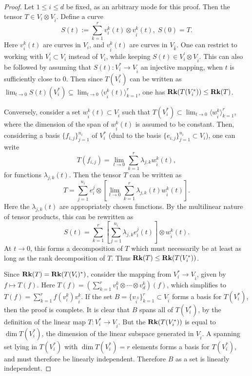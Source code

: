 \documentclass[../Lael_John_MasterThesis_Draft.tex]{subfiles}
\begin{document}
\begin{proof}
    Let $1 \leq i \leq d$ be fixed, as an arbitrary mode for this proof. Then the tensor $T \in V_i \otimes V_{\hat{i}}$. Define a curve 
    \begin{equation}
        S(t):= \sum_{k=1}^{r} v^k_i(t) \otimes v_{\hat{i}}^k(t),\; S(0) = T.
    \end{equation}
    Here $v_i^k(t)$ are curves in $V_i$, and $v_{\hat{i}}^k(t)$ are curves in $V_{\hat{k}}$. One can restrict to working with $V_i^{\prime} \subset V_i$ instead of $V_i$, while keeping $S(t) \in V_i^{\prime} \otimes V_{\hat{i}}$. This can also be followed by assuming that $S(t): V_i^* \to V_{\hat{i}}$ an injective mapping, when $t$ is sufficiently close to $0$. Then since $T(V_i^*)$ can be written as $\lim_{t \to 0} S(t)(V_i^*) \subseteq \lim_{t\to 0} \langle v_{\hat{i}}^k(t) \rangle_{k=1}^r$, one has $\textbf{Rk}(T(V_i^*)) \leq \textbf{Rk}(T)$.
    
    Conversely, consider a set $w_{\hat{i}}^k(t) \subset V_{\hat{i}}$ such that $T(V_i^*) \subset \lim_{t\to 0} \langle w_{\hat{i}}^k \rangle_{k=1}^r$, where the dimension of the span of $w_{\hat{i}}^k(t)$ is assumed to be constant. Then, considering a basis $\{f_{i,j}\}_{j=1}^{n_i}$ of $V_i^*$ (dual to the basis $\{e_{i,j}\}_{j=1}^{n_i} \subset V_i$), one can write $$T(f_{i,j}) = \lim_{t \to 0} \sum_{k=1}^{r} \lambda_{j,k}w_{\hat{i}}^k(t),$$ for functions $\lambda_{j,k}(t)$. Then the tensor $T$ can be written as $$T = \sum_{j=1}^{n_i} e^j_i \otimes \left[\lim_{t\to 0}\sum_{k=1}^{r}\lambda_{j,k}(t)w_{\hat{i}}^k(t)\right].$$ Here the $\lambda_{j,k}(t)$ are appropriately chosen functions. By the multilinear nature of tensor products, this can be rewritten as $$S(t) = \sum_{k=1}^{r} \left[\sum_{j=1}^{n_i}\lambda_{j,k}e_i^j(t)\right] \otimes w_{\hat{i}}^k(t).$$At $t \to 0$, this forms a decomposition of $T$ which must necessarily be at least as long as the rank decomposition of $T$. Thus $\textbf{Rk}(T) \leq \textbf{Rk}(T(V_i^*))$. 

    Since $\textbf{Rk}(T) = \textbf{Rk}(T(V_i)^*)$, consider the mapping from $V_i^* \to V_{\hat{i}}$, given by $f \mapsto T(f)$. Here $T(f) = (\sum_{k=1}^r v_1^k \otimes \cdots \otimes v_d^k)(f)$, which simplifies to $T(f) = \sum_{k=1}^{r} f(v_i^k)v_{\hat{i}}^k$. If the set $B = \{v_{\hat{i}^k}\}_{k=1}^r \subset V_{\hat{i}}$ forms a basis for $T(V_i^*)$, then the proof is complete. It is clear that $B$ spans all of $T(V_i^*)$, by the definition of the linear map $T: V_i^* \to V_{\hat{i}}$.
    But the $\textbf{Rk}(T(V_i^*))$ is equal to $\dim T(V_i^*)$, the dimension of the linear subspace generated in $V_{\hat{i}}$. A spanning set lying in $T(V_i^*)$ with $\dim T(V_i^*) = r$ elements forms a basis for $T(V_i^*)$, and must therefore be linearly independent. Therefore $B$ as a set is linearly independent.  
\end{proof}
\end{document}
